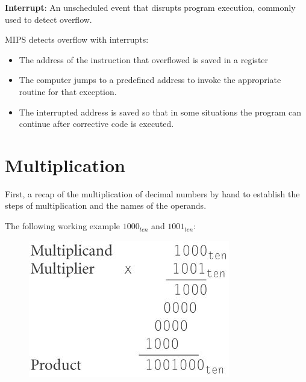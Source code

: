 \documentclass[10pt,a4paper]{article}
\begin{document}
\begin{tcolorbox}[breakable,colback=white]
\textbf{Interrupt}: An unscheduled event that disrupts program execution, commonly used to detect overflow.
\end{tcolorbox}

MIPS detects overflow with interrupts:
\begin{itemize}
    \item The address of the instruction that overflowed is saved in a register
    \item The computer jumps to a predefined address to invoke the appropriate routine for that 
    exception.
    \item The interrupted address is saved so that in some situations the program 
    can continue after corrective code is executed.
\end{itemize}  

\pagebreak

\section{Multiplication}

First, a recap of the multiplication of decimal numbers by hand to establish the steps of
multiplication and the names of the operands. 

The following working example $1000_{ten}$ and $1001_{ten}$:
\begin{figure} [h!]
    \centering
    \includegraphics[scale=0.6]{Multiplication.JPG}
\end{figure}
\end{document}

